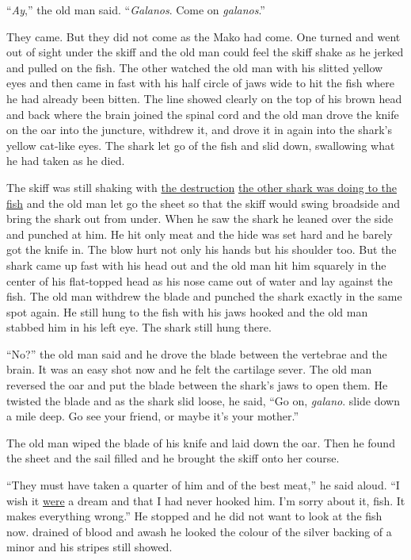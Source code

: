 \documentclass[fontset=ubuntu,zihao=-4]{ctexrep}
\begin{document}
``\emph{Ay},'' the old man said. ``\emph{Galanos}. Come on \emph{galanos}.''

They came. But they did not come as the Mako had come. One turned and went
out of sight under the skiff and the old man could feel the skiff \gls{shake} as
he jerked and pulled on the fish. The other watched the old man with his
\gls{slitted} yellow eyes and then came in fast with his half circle of jaws
wide to hit the fish where he had already been \gls{bitten}. The line showed
clearly on the top of his brown head and back where the brain joined the
\gls{spinal} cord and the old man drove the knife on the oar into the
\gls{juncture}, \gls{withdrew} it, and drove it in again into the shark's yellow
cat-like eyes. The shark let go of the fish and slid down, swallowing what
he had taken as he died.

The skiff was still shaking with \uline{the destruction} \uline{the other shark
  was doing to the fish} and the old man let go the sheet so that the skiff
would \gls{swing} \gls{broadside} and bring the shark out from under. When he saw
the shark he leaned over the side and \gls{punched} at him. He hit only meat
and the hide was set hard and he \gls{barely} got the knife in. The blow hurt
not only his hands but his shoulder too. But the shark came up fast with his
head out and the old man hit him \gls{squarely} in the center of his
flat-topped head as his nose came out of water and lay against the fish. The
old man withdrew the blade and punched the shark exactly in the same
spot again. He still hung to the fish with his jaws hooked and the old man
\gls{stabbed} him in his left eye. The shark still hung there.

``No?'' the old man said and he drove the blade between the \gls{vertebrae}
and the brain. It was an easy shot now and he felt the \gls{cartilage}
\gls{sever}. The old man \gls{reversed} the oar and put the blade between the
shark's jaws to open them. He \gls{twisted} the blade and as the shark slid
loose, he said, ``Go on, \emph{galano}. \Gls{slide} down a mile deep. Go see your friend,
or maybe it's your mother.''

The old man wiped the blade of his knife and laid down the oar. Then he
found the sheet and the sail filled and he brought the skiff onto her
course.

``They must have taken a quarter of him and of the best meat,'' he said
aloud. ``I wish it \uline{were} a dream and that I had never hooked him.
I'm sorry about it, fish. It makes everything wrong.'' He stopped and he did
not want to look at the fish now. \Gls{drained} of blood and \gls{awash} he
looked the colour of the silver backing of a minor and his stripes still
showed.
\end{document}
